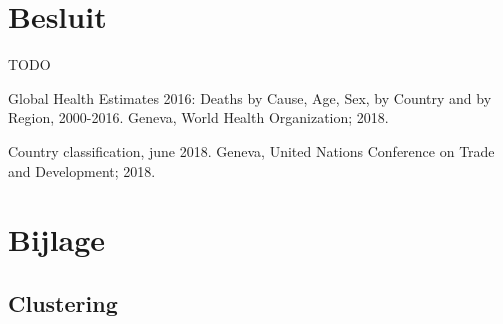 \documentclass[a4paper,kulak]{kulakarticle}
\begin{document}
\section*{Besluit}

TODO


\begin{thebibliography}{9}
	
	Global Health Estimates 2016: Deaths by Cause, Age, Sex, by Country and by Region, 2000-2016.
	Geneva, World Health Organization; 2018.
	
	Country classification, june 2018. Geneva, United Nations Conference on Trade and Development;
	2018.
	
\end{thebibliography}

\newpage
\section{Bijlage} \label{b}
\subsection{Clustering}
\end{document}
